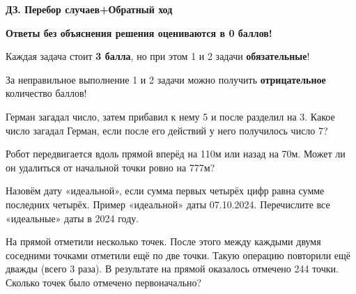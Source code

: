 \centerline{\bf \Huge ДЗ. Перебор случаев+Обратный ход}
\centerline{\bf \Huge }

\begin{flushright}
        \scriptsize{\textbf{Ответы без объяснения решения оцениваются в 0 баллов!}}
\end{flushright}

Каждая задача стоит \textbf{3 балла}, но при этом 1 и 2 задачи \textbf{обязательные}! 

За неправильное выполнение 1 и 2 задачи можно получить \textbf{отрицательное} количество баллов!

 Герман загадал число, затем прибавил к нему 5 и после разделил на 3. Какое число загадал Герман, если после его действий у него получилось число 7?

 Робот передвигается вдоль прямой вперёд на 110м или назад на 70м. Может ли он удалиться от начальной точки ровно на 777м?

 Назовём дату «идеальной», если сумма первых четырёх цифр равна сумме последних четырёх. Пример «идеальной» даты 07.10.2024. Перечислите все «идеальные» даты в 2024 году.

  На прямой отметили несколько точек. После этого между каждыми двумя соседними точками отметили ещё по две точки. Такую операцию повторили ещё дважды (всего 3 раза). В результате на прямой оказалось отмечено 244 точки. Сколько точек было отмечено первоначально?

